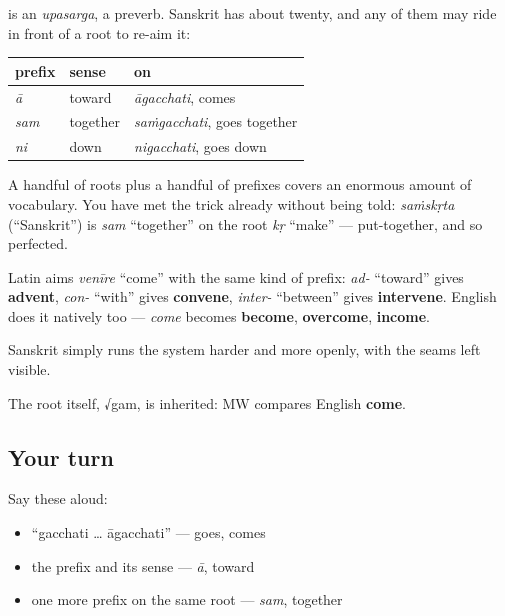 \begin{grammarlens}[title={Grammar Lens: the upasarga, Sanskrit's aiming device}]
\textbf{} is an \emph{upasarga}, a preverb. Sanskrit has about twenty, and any of them may ride in front of a root to re-aim it:

\noindent
\begin{tabularx}{\linewidth}{@{}>{\raggedright\arraybackslash}X>{\raggedright\arraybackslash}X>{\raggedright\arraybackslash}X@{}}
\toprule
\textbf{prefix} & \textbf{sense} & \textbf{on \sk{गम्}} \\
\midrule
\sk{आ} \emph{ā} & toward & \emph{āgacchati}, comes \\
\sk{सम्} \emph{sam} & together & \emph{saṁgacchati}, goes together \\
\sk{नि} \emph{ni} & down & \emph{nigacchati}, goes down \\
\bottomrule
\end{tabularx}

A handful of roots plus a handful of prefixes covers an enormous amount of vocabulary. You have met the trick already without being told: \emph{saṁskṛta} (\textquotedblleft{}Sanskrit\textquotedblright{}) is \emph{sam} \textquotedblleft{}together\textquotedblright{} on the root \emph{kṛ} \textquotedblleft{}make\textquotedblright{} — put-together, and so perfected.
\end{grammarlens}

\begin{cousinweb}
Latin aims \emph{venīre} \textquotedblleft{}come\textquotedblright{} with the same kind of prefix: \emph{ad-} \textquotedblleft{}toward\textquotedblright{} gives \textbf{advent}, \emph{con-} \textquotedblleft{}with\textquotedblright{} gives \textbf{convene}, \emph{inter-} \textquotedblleft{}between\textquotedblright{} gives \textbf{intervene}. English does it natively too — \emph{come} becomes \textbf{become}, \textbf{overcome}, \textbf{income}.

Sanskrit simply runs the system harder and more openly, with the seams left visible.

The root itself, √gam, is inherited: MW compares English \textbf{come}.
\end{cousinweb}

\subsection*{Your turn}
Say these aloud:

\begin{itemize}
\raggedright
  \item \textquotedblleft{}gacchati … āgacchati\textquotedblright{} — goes, comes
  \item the prefix and its sense — \emph{ā}, toward
  \item one more prefix on the same root — \emph{sam}, together
\end{itemize}

